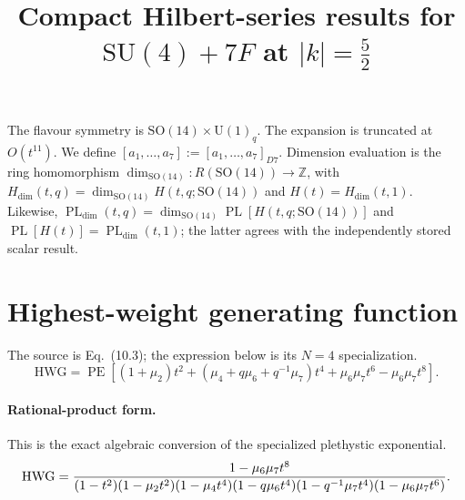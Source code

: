 \documentclass[10pt]{article}
\title{Compact Hilbert-series results for $\mathrm{SU(4)}+7F$ at $\lvert k\rvert=\frac{5}{2}$}
\date{}
\newcommand{\PE}{\operatorname{PE}}
\begin{document}
\maketitle
The flavour symmetry is $\mathrm{SO}(14)\times\mathrm{U}(1)_{q}$.
The expansion is truncated at $O(t^{11})$.  We define
$[a_1,\ldots,a_{7}]:=[a_1,\ldots,a_{7}]_{D7}$.
Dimension evaluation is the ring homomorphism
$\dim_{\mathrm{SO}(14)}:R(\mathrm{SO}(14))\to\mathbb{Z}$, with
$H_{\mathrm{dim}}(t,q)=\dim_{\mathrm{SO}(14)}H(t,q;\mathrm{SO}(14))$
and $H(t)=H_{\mathrm{dim}}(t,1)$. Likewise,
$\operatorname{PL}_{\mathrm{dim}}(t,q)=\dim_{\mathrm{SO}(14)}
\operatorname{PL}[H(t,q;\mathrm{SO}(14))]$ and
$\operatorname{PL}[H(t)]=\operatorname{PL}_{\mathrm{dim}}(t,1)$;
the latter agrees with the independently stored scalar result.


\section{Highest-weight generating function}
The source is Eq.~(10.3); the expression below is its $N=4$ specialization.
\begin{equation}
\mathrm{HWG}=\PE\!\left[(1+\mu_2)t^2+(\mu_4+q\mu_6+q^{-1}\mu_7)t^4
+\mu_6\mu_7t^6-\mu_6\mu_7t^8\right].
\end{equation}
\paragraph{Rational-product form.} This is the exact algebraic conversion of the specialized plethystic exponential.
\begin{equation}
\resizebox{0.98\linewidth}{!}{${\displaystyle
\mathrm{HWG}=\frac{1-\mu_6\mu_7t^8}
{(1-t^2)(1-\mu_2t^2)(1-\mu_4t^4)(1-q\mu_6t^4)(1-q^{-1}\mu_7t^4)(1-\mu_6\mu_7t^6)}.}$}
\end{equation}
\end{document}
